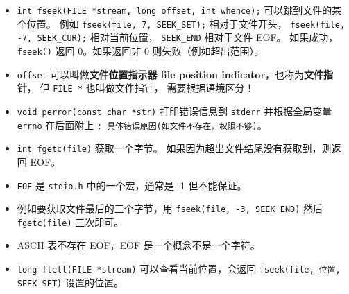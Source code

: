 \begin{itemize}
\begin{lstlisting}[language=cpp]
    // Step 4: Move the file pointer to a specific location, modify contents
    fseek(file, 7, SEEK_SET); // Jump to the 8th character
    fputs("Universe", file);  // Overwrite "World" with "Universe"

    // Step 5: Jump to the beginning again to read the updated content
    fseek(file, 0, SEEK_SET);
    printf("\nUpdated file contents:\n");
    while (fgets(buffer, sizeof(buffer), file) != NULL) {
        printf("%s", buffer);
    }

    // Close the file
    fclose(file);
    return 0;
}
\end{lstlisting}
\item \verb`int fseek(FILE *stream, long offset, int whence);` 可以跳到文件的某个位置。 例如 \verb`fseek(file, 7, SEEK_SET);` 相对于文件开头， \verb`fseek(file, -7, SEEK_CUR);` 相对当前位置， \verb`SEEK_END` 相对于文件 EOF。 如果成功，\verb`fseek()` 返回 0。如果返回非 0 则失败（例如超出范围）。
\item \verb`offset` 可以叫做\textbf{文件位置指示器 file position indicator}，也称为\textbf{文件指针}， 但 \verb`FILE *` 也叫做文件指针， 需要根据语境区分！
\item \verb`void perror(const char *str)` 打印错误信息到 \verb`stderr` 并根据全局变量 \verb`errno` 在后面附上 \verb`: 具体错误原因(如文件不存在，权限不够)`。
\item \verb`int fgetc(file)` 获取一个字节。 如果因为超出文件结尾没有获取到，则返回 EOF。
\item \verb`EOF` 是 \verb`stdio.h` 中的一个宏，通常是 -1 但不能保证。
\item 例如要获取文件最后的三个字节，用 \verb`fseek(file, -3, SEEK_END)` 然后 \verb`fgetc(file)` 三次即可。
\item ASCII 表不存在 EOF，EOF 是一个概念不是一个字符。
\item \verb`long ftell(FILE *stream)` 可以查看当前位置，会返回 \verb`fseek(file, 位置, SEEK_SET)` 设置的位置。
\end{itemize}

